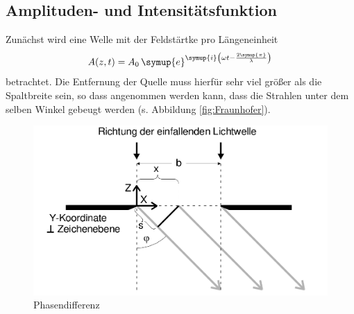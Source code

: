 \subsection{Amplituden- und Intensitätsfunktion}
Zunächst wird eine Welle mit der Feldstärtke pro Längeneinheit
\begin{equation}
    A(z, t) = A_0 \, \symup{e}^{\symup{i} \left (\omega t - \frac{2\symup{\pi}}{\lambda} \right )}
\end{equation}
betrachtet.
Die Entfernung der Quelle muss hierfür sehr viel größer als die Spaltbreite sein, so dass angenommen werden kann, dass die Strahlen unter dem selben Winkel gebeugt werden (s. Abbildung 
\ref{fig:Fraunhofer}).
\begin{figure}
    \centering
    \caption{Phasendifferenz}
    \label{Phasendifferenz}
    \includegraphics[width = 0.6 \textwidth]{pics/Phasendifferenz.PNG}
\end{figure}